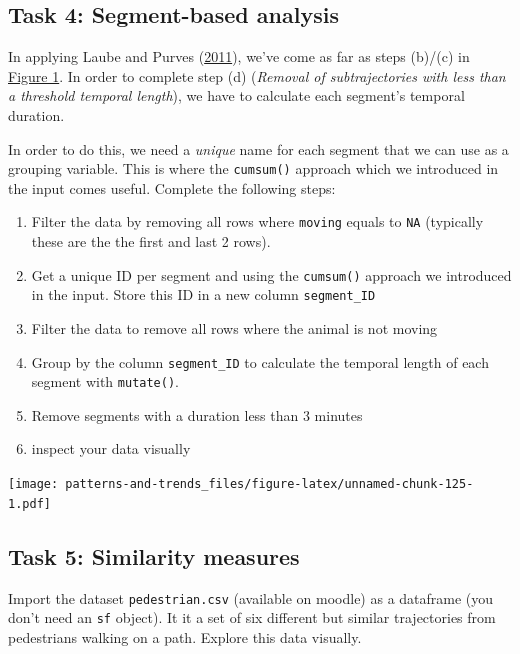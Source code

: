 \documentclass[]{book}
\providecommand{\tightlist}{%
  \setlength{\itemsep}{0pt}\setlength{\parskip}{0pt}}
\begin{document}
\subsection{Task 4: Segment-based
analysis}\label{task-4-segment-based-analysis}

In applying Laube and Purves (\protect\hyperlink{ref-laube2011}{2011}),
we've come as far as steps (b)/(c) in
\href{02_Images/laube_2011.jpg}{Figure 1}. In order to complete step (d)
(\emph{Removal of subtrajectories with less than a threshold temporal
length}), we have to calculate each segment's temporal duration.

In order to do this, we need a \emph{unique} name for each segment that
we can use as a grouping variable. This is where the \texttt{cumsum()}
approach which we introduced in the input comes useful. Complete the
following steps:

\begin{enumerate}
\def\labelenumi{\arabic{enumi}.}
\tightlist
\item
  Filter the data by removing all rows where \texttt{moving} equals to
  \texttt{NA} (typically these are the the first and last 2 rows).
\item
  Get a unique ID per segment and using the \texttt{cumsum()} approach
  we introduced in the input. Store this ID in a new column
  \texttt{segment\_ID}
\item
  Filter the data to remove all rows where the animal is not moving
\item
  Group by the column \texttt{segment\_ID} to calculate the temporal
  length of each segment with \texttt{mutate()}.
\item
  Remove segments with a duration less than 3 minutes
\item
  inspect your data visually
\end{enumerate}

\texttt{[image: patterns-and-trends\_files/figure-latex/unnamed-chunk-125-1.pdf]}

\subsection{Task 5: Similarity
measures}\label{task-5-similarity-measures}

Import the dataset \texttt{pedestrian.csv} (available on moodle) as a
dataframe (you don't need an \texttt{sf} object). It it a set of six
different but similar trajectories from pedestrians walking on a path.
Explore this data visually.
\end{document}
